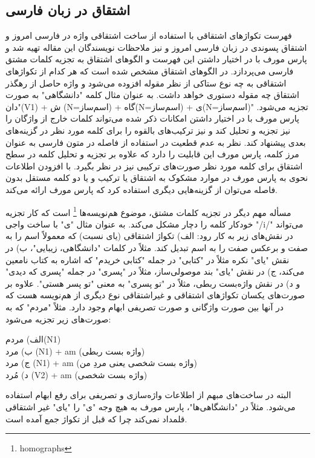 \documentclass[12pt,onecolumn,a4paper]{article}
\begin{document}
    \subsection{اشتقاق در زبان فارسی}
    فهرست تکواژهای اشتقاقی با استفاده از ساخت اشتقاقی واژه در فارسی امروز {\mfo\citep{Kalbasi71}} و اشتقاق پسوندی در زبان فارسی امروز {\mfo\citep{Kashani71}} و نیز ملاحظات نویسندگان این مقاله تهیه شد و پارس مورف با در اختیار داشتن این فهرست و الگوهای اشتقاق به تجزیه کلمات مشتق فارسی می‌پردازد. در الگوهای اشتقاق مشخص شده است که هر کدام از تکواژهای اشتقاقی به چه نوع ستاکی از نظر مقوله افزوده می‌شود و واژه حاصل از رهگذر اشتقاق چه مقوله دستوری خواهد داشت. به عنوان مثال کلمه "دانشگاهی" به صورت "دان(V1) + ش (N=اسم‌ساز) + گاه(N=اسم‌ساز) + ی(N=اسم‌ساز)" تجزیه می‌شود. پارس مورف با در اختیار داشتن امکانات ذکر شده می‌تواند کلمات خارج از واژگان را نیز تجزیه و تحلیل کند و نیز ترکیب‌های بالقوه را برای کلمه مورد نظر در گزینه‌های بعدی پیشنهاد کند. نظر به عدم قطعیت در استفاده از فاصله در متون فارسی به عنوان مرز کلمه، پارس مورف این قابلیت را دارد که علاوه بر تجزیه و تحلیل کلمه در سطح اشتقاق برای کلمه مورد نظر صورت‌های ترکیبی نیز در نظر بگیرد. با افزودن اطلاعات نحوی به پارس مورف در موارد مشکوک به اشتقاق یا ترکیب و یا دو کلمه مستقل بدون فاصله می‌توان از گزینه‌هایی دیگری استفاده کرد که پارس مورف ارائه می‌کند.
    \par\noindent
    مسأله مهم دیگر در تجزیه کلمات مشتق، موضوع هم‌نویسه‌ها \footnote{homographs} است که کار تجزیه خودکار کلمه را دچار مشکل می‌کند. به عنوان مثال "ی" با ساخت واجی "/i/" می‌تواند در نقش‌های زیر به کار رود: الف) تکواژ اشتقاقی (یای نسبت) که معمولاً اسم را به صفت و برعکس صفت را به اسم تبدیل کند. مثلاً در کلمات "دانشگاهی، زیبایی"، ب) در نقش "یای" نکره مثلاً در "کتابی" در جمله "کتابی خریدم" که اشاره به کتاب نامعین می‌کند، ج) در نقش "یای" بند موصولی‌ساز، مثلاً در "پسری" در جمله "پسری که دیدی" و د) در نقش واژه‌بست ربطی، مثلاً در "تو پسری" به معنی "تو پسر هستی". علاوه بر صورت‌های یکسان تکواژهای اشتقاقی و غیراشتقاقی نوع دیگری از هم‌نویسه هست که در آنها بین صورت واژگانی و صورت تصریفی ابهام وجود دارد. مثلاً "مردم" که به صورت‌های زیر تجزیه می‌شود:
    \par\noindent
    الف) مردم(N1)
    \\
    ب) مرد (N1) + am (واژه بست ربطی)
    \\
    ج) مرد (N1) + am (واژه بست شخصی یعنی مردِ من)
    \\
    د) مُرد (V2) + am (واژه بست شخصی)
    \par\noindent
    البته در ساخت‌های مبهم از اطلاعات واژه‌سازی و تصریفی برای رفع ابهام استفاده می‌شود. مثلاً در "دانشگاهی‌ها"، پارس مورف به هیچ وجه "ی" را "یای" غیر اشتقاقی قلمداد نمی‌کند چرا که قبل از تکواژ جمع آمده است.
\end{document}
